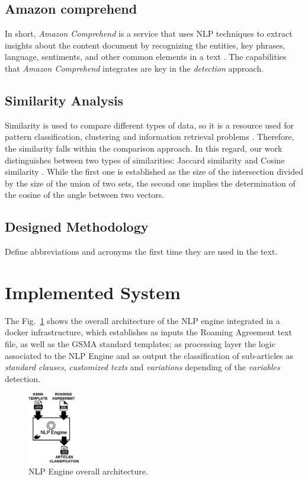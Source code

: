 \documentclass[conference]{style/IEEEtran}
\begin{document}
\subsection{Amazon comprehend}
In short, \textit{Amazon Comprehend} is a service that uses NLP techniques to extract insights about the content document by recognizing  the  entities,  key  phrases,  language,  sentiments,  and  other  common  elements  in  a  text \cite{AWS2021}. The capabilities that \textit{Amazon Comprehend} integrates are key in the \textit{detection} approach.

\subsection{Similarity Analysis}
Similarity is used to compare different types of data, so it is a resource used for pattern classification, clustering and information retrieval problems \cite{7429408}. Therefore, the similarity falls within the comparison approach. In this regard, our work distinguishes between two types of similarities: Jaccard similarity and Cosine similarity \cite{Gupta2018}. While the first one is established as the size of the intersection divided by the size of the union of two sets, the second one implies the determination of the cosine of the angle between two vectors.

\subsection{Designed Methodology}
Define abbreviations and acronyms the first time they are used in the text.

\section{Implemented System}
The Fig.~\ref{fig1} shows the overall architecture of the NLP engine integrated in a docker infrastructure, which establishes as inputs the Roaming Agreement text file, as well as the GSMA standard templates; as processing layer the logic associated to the NLP Engine and as output the classification of sub-articles as \textit{standard clauses}, \textit{customized texts} and \textit{variations} depending of the \textit{variables} detection.

\begin{figure}[htbp]
\centerline{\includegraphics[width=0.2\textwidth]{images/NLP_Engine.png}}
\caption{NLP Engine overall architecture.}
\label{fig1}
\end{figure}
\end{document}
